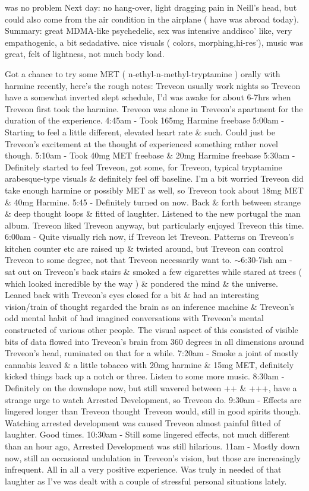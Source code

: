 \documentclass[12pt]{book}
\begin{document}
was no problem Next day: no hang-over, light dragging pain in Neill's head, but could also come from the air condition in the airplane ( have was abroad today). Summary: great MDMA-like psychedelic, sex was intensive anddisco' like, very empathogenic, a bit sedadative. nice visuals ( colors, morphing,hi-res'), music was great, felt of lightness, not much body load.



Got a chance to try some MET ( n-ethyl-n-methyl-tryptamine ) orally with harmine recently, here's the rough notes: Treveon usually work nights so Treveon have a somewhat inverted slept schedule, I'd was awake for about 6-7hrs when Treveon first took the harmine. Treveon was alone in Treveon's apartment for the duration of the experience. 4:45am - Took 165mg Harmine freebase 5:00am - Starting to feel a little different, elevated heart rate \& such. Could just be Treveon's excitement at the thought of experienced something rather novel though. 5:10am - Took 40mg MET freebase \& 20mg Harmine freebase 5:30am - Definitely started to feel Treveon, got some, for Treveon, typical tryptamine arabesque-type visuals \& definitely feel off baseline. I'm a bit worried Treveon did take enough harmine or possibly MET as well, so Treveon took about 18mg MET \& 40mg Harmine. 5:45 - Definitely turned on now. Back \& forth between strange \& deep thought loops \& fitted of laughter. Listened to the new portugal the man album. Treveon liked Treveon anyway, but particularly enjoyed Treveon this time. 6:00am - Quite visually rich now, if Treveon let Treveon. Patterns on Treveon's kitchen counter etc are raised up \& twisted around, but Treveon can control Treveon to some degree, not that Treveon necessarily want to. $\sim$6:30-7ish am - sat out on Treveon's back stairs \& smoked a few cigarettes while stared at trees ( which looked incredible by the way ) \& pondered the mind \& the universe. Leaned back with Treveon's eyes closed for a bit \& had an interesting vision/train of thought regarded the brain as an inference machine \& Treveon's odd mental habit of had imagined conversations with Treveon's mental constructed of various other people. The visual aspect of this consisted of visible bits of data flowed into Treveon's brain from 360 degrees in all dimensions around Treveon's head, ruminated on that for a while. 7:20am - Smoke a joint of mostly cannabis leaved \& a little tobacco with 20mg harmine \& 15mg MET, definitely kicked things back up a notch or three. Listen to some more music. 8:30am - Definitely on the downslope now, but still wavered between ++ \& +++, have a strange urge to watch Arrested Development, so Treveon do. 9:30am - Effects are lingered longer than Treveon thought Treveon would, still in good spirits though. Watching arrested development was caused Treveon almost painful fitted of laughter. Good times. 10:30am - Still some lingered effects, not much different than an hour ago, Arrested Development was still hilarious. 11am - Mostly down now, still an occasional undulation in Treveon's vision, but those are increasingly infrequent. All in all a very positive experience. Was truly in needed of that laughter as I've was dealt with a couple of stressful personal situations lately. 
\end{document}
